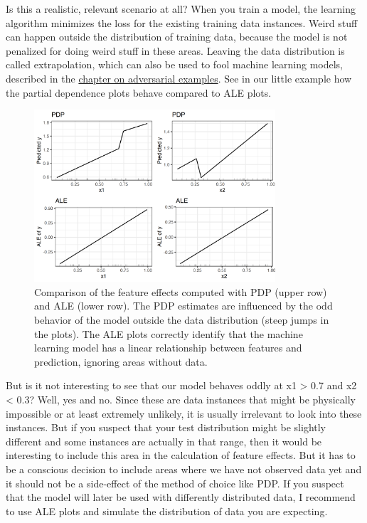 \documentclass[
  10pt,
]{scrbook}
\begin{document}
Is this a realistic, relevant scenario at all?
When you train a model, the learning algorithm minimizes the loss for the existing training data instances.
Weird stuff can happen outside the distribution of training data, because the model is not penalized for doing weird stuff in these areas.
Leaving the data distribution is called extrapolation, which can also be used to fool machine learning models, described in the \protect\hyperlink{adversarial}{chapter on adversarial examples}.
See in our little example how the partial dependence plots behave compared to ALE plots.

\begin{figure}

{\centering \includegraphics[width=0.8\textwidth]{images/correlation-pdp-ale-plot-1} 

}

\caption{Comparison of the feature effects computed with PDP (upper row) and ALE (lower row). The PDP estimates are influenced by the odd behavior of the model outside the data distribution (steep jumps in the plots). The ALE plots correctly identify that the machine learning model has a linear relationship between features and prediction, ignoring areas without data.}\label{fig:correlation-pdp-ale-plot}
\end{figure}

But is it not interesting to see that our model behaves oddly at x1 \textgreater{} 0.7 and x2 \textless{} 0.3?
Well, yes and no.
Since these are data instances that might be physically impossible or at least extremely unlikely, it is usually irrelevant to look into these instances.
But if you suspect that your test distribution might be slightly different and some instances are actually in that range, then it would be interesting to include this area in the calculation of feature effects.
But it has to be a conscious decision to include areas where we have not observed data yet and it should not be a side-effect of the method of choice like PDP.
If you suspect that the model will later be used with differently distributed data, I recommend to use ALE plots and simulate the distribution of data you are expecting.
\end{document}
